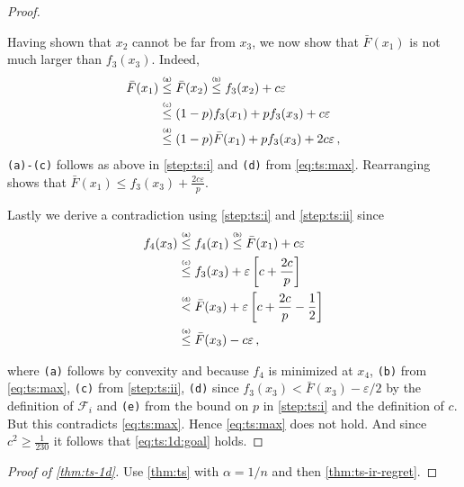 \documentclass[letter, 12pt]{report}
\newcommand{\explan}[1]{\stackrel{\text{\tiny \texttt{#1}}}}
\newcommand{\sF}{\mathscr F}
\newcommand{\1}{\mathbf{1}}
\renewcommand{\epsilon}{\varepsilon}
\theoremstyle{plain}
\theoremstyle{definition}
\theoremstyle{remark}
\begin{document}
\begin{proof}
\begin{enumsteps}
        \item \label{step:ts:ii} Having shown that $x_2$ cannot be far from $x_3$,
        we now show that $\bar{F}(x_1)$ is not much larger than $f_3(x_3)$.
        Indeed,
        \begin{align*}
            \bar F(x_1)
             & \explan{(a)}\leq \bar F(x_2)
            \explan{(b)}\leq f_3(x_2) + c\epsilon                                 \\
             & \explan{(c)}\leq (1 - p) f_3(x_1) + p f_3(x_3) + c\epsilon         \\
             & \explan{(d)}\leq (1 - p) \bar F(x_1) + p f_3(x_3) + 2c\epsilon \,,
        \end{align*}
        \texttt{(a)-(c)} follows as above in \ref{step:ts:i} and \texttt{(d)} from \cref{eq:ts:max}.
        Rearranging shows that $\bar F(x_1) \leq f_3(x_3) + \frac{2c\epsilon}{p}$.

        \item \label{step:ts:iii}
        Lastly we derive a contradiction using \ref{step:ts:i} and \ref{step:ts:ii} since
        \begin{align*}
            f_4(x_3)
             & \explan{(a)}\leq f_4(x_1)
            \explan{(b)}\leq \bar F(x_1) + c\epsilon                                            \\
             & \explan{(c)}\leq f_3(x_3) + \epsilon\left[c + \frac{2c}{p}\right]                \\
             & \explan{(d)} < \bar F(x_3) + \epsilon\left[c + \frac{2c}{p} - \frac{1}{2}\right] \\
             & \explan{(e)}\leq \bar F(x_3) - c \epsilon \,,
        \end{align*}
    \end{enumsteps}
    where \texttt{(a)} follows by convexity and because $f_4$ is minimized at $x_4$,
    \texttt{(b)} from \cref{eq:ts:max},
    \texttt{(c)} from \ref{step:ts:ii},
    \texttt{(d)} since $f_3(x_3) < \bar F(x_3) - \epsilon/2$ by the definition of $\sF_i$
    and \texttt{(e)} from the bound on $p$ in \ref{step:ts:i} and the definition of $c$.
    But this contradicts \cref{eq:ts:max}.
    Hence \cref{eq:ts:max} does not hold. And since $c^2 \geq \frac{1}{230}$ it follows that \cref{eq:ts:1d:goal} holds.
\end{proof}
\begin{proof}[Proof of \cref{thm:ts-1d}]
    Use \cref{thm:ts} with $\alpha= 1/n$ and then \cref{thm:ts-ir-regret}.
\end{proof}
\end{document}
